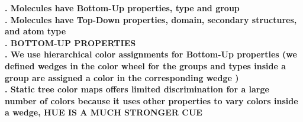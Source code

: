 \documentclass[review,journal]{vgtc}         %
\begin{document}
\textbf{. Molecules have Bottom-Up properties, type and group} \\


\textbf{. Molecules have Top-Down properties, domain, secondary structures, and atom type} \\


\textbf{. BOTTOM-UP PROPERTIES} \\

\textbf{. We use hierarchical color assignments for Bottom-Up properties (we defined wedges in the color wheel for the groups and types inside a group are assigned a color in the corresponding wedge )} \\


\textbf{. Static tree color maps offers limited discrimination for a large number of colors because it uses other properties to vary colors inside a wedge, HUE IS A MUCH STRONGER CUE} \\

\end{document}
